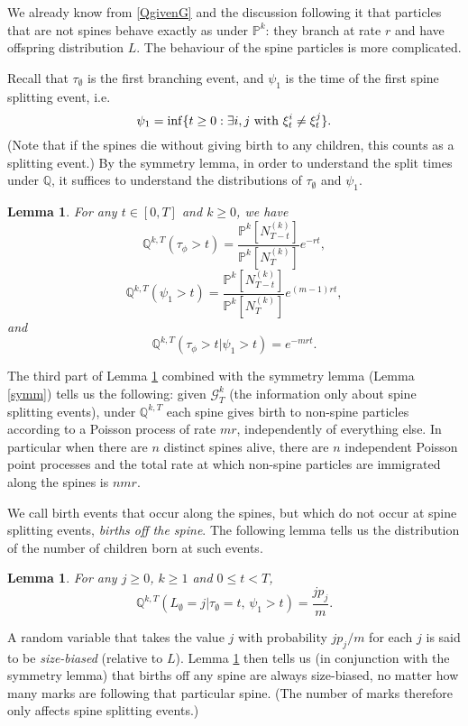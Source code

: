 \documentclass{article}
\theoremstyle{plain}
\newtheorem{lem}[thm]{Lemma}
\theoremstyle{definition}
\newcommand{\Q}{\mathbb{Q}}
\renewcommand{\P}{\mathbb{P}}
\newcommand{\G}{\mathcal{G}}
\begin{document}
We already know from \eqref{QgivenG} and the discussion following it that particles that are not spines behave exactly as under $\P^k$: they branch at rate $r$ and have offspring distribution $L$. The behaviour of the spine particles is more complicated.

Recall that $\tau_\emptyset$ is the first branching event, and $\psi_1$ is the time of the first spine splitting event, i.e.
\[\psi_1 = \inf\{t\ge 0 : \exists i, j \hbox{ with } \xi^i_t \neq \xi^j_t\}.\]
(Note that if the spines die without giving birth to any children, this counts as a splitting event.)
By the symmetry lemma, in order to understand the split times under $\Q$, it suffices to understand the distributions of $\tau_\emptyset$ and $\psi_1$.

\begin{lem}\label{Qbots}
For any $t\in[0,T]$ and $k\ge 0$, we have
\[\Q^{k,T}(\tau_\phi > t) = \frac{\P^k[N^{(k)}_{T-t}]}{\P^k[N^{(k)}_T]} e^{-rt},\]
\[\Q^{k,T}(\psi_1 > t) = \frac{\P^k[N^{(k)}_{T-t}]}{\P^k[N^{(k)}_T]} e^{(m-1)rt},\]
and
\[\Q^{k,T}(\tau_\phi > t | \psi_1 > t) = e^{-mrt}.\]
\end{lem}

The third part of Lemma \ref{Qbots} combined with the symmetry lemma (Lemma \ref{symm}) tells us the following: given $\G^k_T$ (the information only about spine splitting events), under $\Q^{k,T}$ each spine gives birth to non-spine particles according to a Poisson process of rate $mr$, independently of everything else. In particular when there are $n$ distinct spines alive, there are $n$ independent Poisson point processes and the total rate at which non-spine particles are immigrated along the spines is $nmr$.

We call birth events that occur along the spines, but which do not occur at spine splitting events, \emph{births off the spine}. The following lemma tells us the distribution of the number of children born at such events.

\begin{lem}\label{sizebiased}
For any $j\ge0$, $k\ge 1$ and $0\le t<T$,
\[\Q^{k,T}(L_\emptyset = j | \tau_\emptyset = t, \, \psi_1>t) = \frac{jp_j}{m}.\]
\end{lem}


A random variable that takes the value $j$ with probability $j p_j/m$ for each $j$ is said to be \emph{size-biased} (relative to $L$). Lemma \ref{sizebiased} then tells us (in conjunction with the symmetry lemma) that births off any spine are always size-biased, no matter how many marks are following that particular spine. (The number of marks therefore only affects spine splitting events.)
\end{document}
